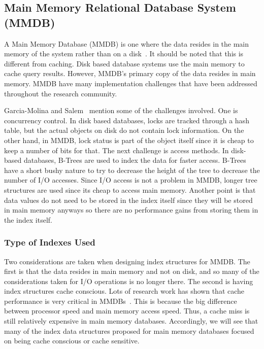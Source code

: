 \documentclass[12pt,a4paper]{article}
\begin{document}
\subsection{Main Memory Relational Database System (MMDB)}
\label{SEC-MMDB}

A Main Memory Database (MMDB) is one where the data resides in the main memory of the system rather than on a disk~\cite{garcia1992main}. It should be noted that this is different from caching. Disk based database systems use the main memory to cache query results. However, MMDB's primary copy of the data resides in main memory. MMDB have many implementation challenges that have been addressed throughout the research community.

Garcia-Molina and Salem~\cite{garcia1992main} mention some of the challenges involved. One is concurrency control. In disk based databases, locks are tracked through a hash table, but the actual objects on disk do not contain lock information. On the other hand, in MMDB, lock status is part of the object itself since it is cheap to keep a number of bits for that. The next challenge is access methods. In disk-based databases, B-Trees are used to index the data for faster access. B-Trees have a short bushy nature to try to decrease the height of the tree to decrease the number of I/O accesses. Since I/O access is not a problem in MMDB, longer tree structures are used since its cheap to access main memory. Another point is that data values do not need to be stored in the index itself since they will be stored in main memory anyways so there are no performance gains from storing them in the index itself. 

\subsubsection{Type of Indexes Used}

Two considerations are taken when designing index structures for MMDB. The first is that the data resides in main memory and not on disk, and so many of the considerations taken for I/O operations is no longer there. The second is having index structures cache conscious. Lots of research work has shown that cache performance is very critical in MMDBs~\cite{rao1999cache, boncz1999database}. This is because the big difference between processor speed and main memory access speed. Thus, a cache miss is still relatively expensive in main memory databases. Accordingly, we will see that many of the index data structures proposed for main memory databases focused on being cache conscious or cache sensitive.
\end{document}

